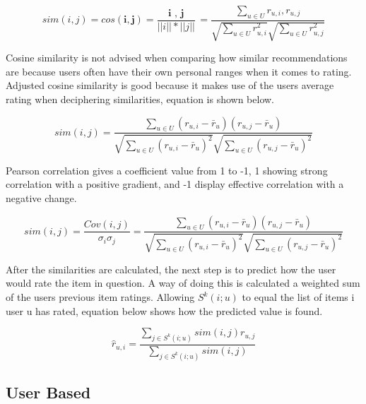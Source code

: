 \begin{equation}
		sim(i , j) = cos( \textbf{i}, \textbf{j} ) = \frac{ \textbf{ i }, \textbf{ j }}{ || i || * || j || } = \frac{ \sum_{ u \in U } r_{ u, i }, r_{ u, j }} { \sqrt{ \sum _{  u \in U } r^{2}_{ u , i}} \sqrt{ \sum _{  u \in U } r^{2}_{ u , j}}}
\end{equation}

Cosine similarity is not advised when comparing how similar recommendations are because users often have their own personal ranges when it comes to rating. Adjusted cosine similarity is good because it makes use of the users average rating when deciphering similarities, equation is shown below.

\begin{equation}
	sim(i , j) = \frac{ \sum_{ u \in U } ( r _{ u, i } - \bar{r} _{u} ) ( r _{ u, j} - \bar{r} _{u} ) } { \sqrt{\sum_{ u \in U } ( r _{ u, i } - \bar{r} _{u} )^2} \sqrt{\sum_{ u \in U } ( r _{ u, j } - \bar{r} _{u} )^2}}
\end{equation}

Pearson correlation gives a coefficient value from 1 to -1, 1 showing strong correlation with a positive gradient, and -1 display effective correlation with a negative change.

\begin{equation}
	sim(i , j) = \frac{ Cov( i, j) }{ \sigma _{i} \sigma _{j} } = \frac{ \sum _{ u \in U} ( r _{ u, i } - \bar{r} _{u} ) ( r _{ u, j} - \bar{r} _{u} ) } { \sqrt{\sum_{ u \in U } ( r _{ u, i } - \bar{r} _{u} )^2} \sqrt{\sum_{ u \in U } ( r _{ u, j } - \bar{r} _{u} )^2}}
\end{equation}

After the similarities are calculated, the next step is to predict how the user would rate the item in question. A way of doing this is calculated a weighted sum of the users previous item ratings. Allowing $ S^{k}(i;u)$ to equal the list of items i user u has rated, equation below shows how the predicted value is found.

\begin{equation}
	\hat{r} _{u,i} = \frac{ \sum _{ j \in S^{k}(i;u)} sim(i , j) r _{u, j}}{\sum _{j \in S^{k}(i;u)} sim(i , j)}
\end{equation}




\subsection{User Based}

